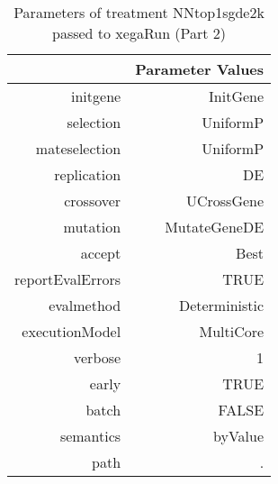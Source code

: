 \begin{table}[ht]
\centering
\begin{tabular}{rr}
  \hline
 & Parameter Values \\ 
  \hline
initgene & InitGene \\ 
  selection & UniformP \\ 
  mateselection & UniformP \\ 
  replication & DE \\ 
  crossover & UCrossGene \\ 
  mutation & MutateGeneDE \\ 
  accept & Best \\ 
  reportEvalErrors & TRUE \\ 
  evalmethod & Deterministic \\ 
  executionModel & MultiCore \\ 
  verbose & 1 \\ 
  early & TRUE \\ 
  batch & FALSE \\ 
  semantics & byValue \\ 
  path & . \\ 
   \hline
\end{tabular}
\caption{ Parameters of treatment NNtop1sgde2k passed to xegaRun
 (Part 2)} 
\end{table}
